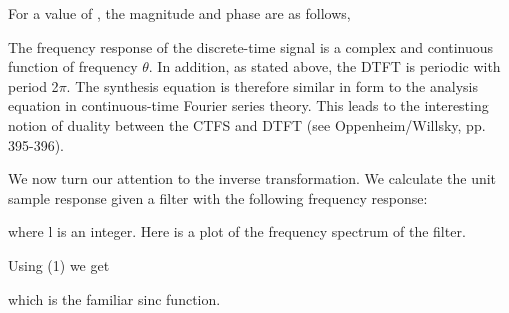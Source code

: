 \documentclass{article}
\begin{document}
\begin{CellGroup}
\begin{CellGroup}
\end{CellGroup}
For a value of , the magnitude and phase are as follows,



\begin{CellGroup}

\end{CellGroup}
The frequency response  of the discrete-time signal  is a complex and continuous function of frequency
\(\theta \).  In addition,  as stated above, the DTFT is periodic with period 2\(\pi \).  The synthesis  equation is therefore similar in form to
the analysis equation in  continuous-time Fourier series theory. This leads to the interesting notion  of duality between the CTFS and DTFT (see
Oppenheim/Willsky, pp. 395-396). 



We now turn our attention to the inverse transformation. We calculate the  unit sample response  given a filter with the following
frequency response:




where l is an integer. Here is a plot of the frequency spectrum of the filter.



\begin{CellGroup}
Using (1) we get

which is the familiar sinc function.


\end{CellGroup}
\end{CellGroup}
\end{document}
